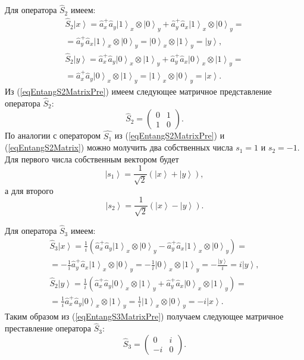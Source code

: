 Для оператора $\hat{S}_2$ имеем:
\begin{eqnarray}
\hat{S}_2 \left|x\right> = \hat{a}_x^{+} \hat{a}_y
\left|1\right>_x\otimes\left|0\right>_y + \hat{a}_y^{+}
\hat{a}_x\left|1\right>_x\otimes\left|0\right>_y =
\nonumber \\
= 
\hat{a}_y^{+}
\hat{a}_x\left|1\right>_x\otimes\left|0\right>_y =
\left|0\right>_x\otimes\left|1\right>_y = \left|y\right>,
\nonumber \\
\hat{S}_2 \left|y\right> = \hat{a}_x^{+} \hat{a}_y
\left|0\right>_x\otimes\left|1\right>_y + \hat{a}_y^{+}
\hat{a}_x\left|0\right>_x\otimes\left|1\right>_y =
\nonumber \\
=
\hat{a}_x^{+} \hat{a}_y
\left|0\right>_x\otimes\left|1\right>_y
=\left|1\right>_x\otimes\left|0\right>_y = \left|x\right>.
\label{eqEntangS2MatrixPre}
\end{eqnarray}
Из (\ref{eqEntangS2MatrixPre}) имеем следующее матричное представление
оператора $\hat{S}_2$:
\begin{equation}
\hat{S}_2 = 
\left(
\begin{array}{cc}
0 & 1 \\
1 & 0 
\end{array}
\right).
\label{eqEntangS2Matrix}
\end{equation}
По аналогии с оператором $\hat{S_1}$ из (\ref{eqEntangS2MatrixPre}) и
(\ref{eqEntangS2Matrix}) можно молучить два собственных числа $s_1 =
1$ и $s_2 = -1$. Для первого числа собственным вектором будет
\[
\left|s_1\right> = \frac{1}{\sqrt{2}}\left(\left|x\right> + \left|y\right>\right),
\]
а для второго
\[
\left|s_2\right> = \frac{1}{\sqrt{2}}\left(\left|x\right> - \left|y\right>\right).
\]

Для оператора $\hat{S}_3$ имеем:
\begin{eqnarray}
  \hat{S}_3 \left|x\right> = \frac{1}{i}\left(\hat{a}_x^{+} \hat{a}_y
\left|1\right>_x\otimes\left|0\right>_y - \hat{a}_y^{+}
\hat{a}_x\left|1\right>_x\otimes\left|0\right>_y\right) =
\nonumber \\
= 
-\frac{1}{i}\hat{a}_y^{+}
\hat{a}_x\left|1\right>_x\otimes\left|0\right>_y =
-\frac{1}{i}\left|0\right>_x\otimes\left|1\right>_y =
-\frac{\left|y\right>}{i} = i \left|y\right>,
\nonumber \\
\hat{S}_2 \left|y\right> = \frac{1}{i}\left(\hat{a}_x^{+} \hat{a}_y
\left|0\right>_x\otimes\left|1\right>_y + \hat{a}_y^{+}
\hat{a}_x\left|0\right>_x\otimes\left|1\right>_y\right) =
\nonumber \\
=
\frac{1}{i}\hat{a}_x^{+} \hat{a}_y
\left|0\right>_x\otimes\left|1\right>_y
=\frac{1}{i}\left|1\right>_x\otimes\left|0\right>_y =
-i \left|x\right>.
\label{eqEntangS3MatrixPre}
\end{eqnarray}
Таким образом из (\ref{eqEntangS3MatrixPre}) получаем следующее
матричное преставление оператора $\hat{S}_3$:
\begin{equation}
\hat{S}_3 = 
\left(
\begin{array}{cc}
0 & i \\
-i & 0 
\end{array}
\right).
\label{eqEntangS3Matrix}
\end{equation}

